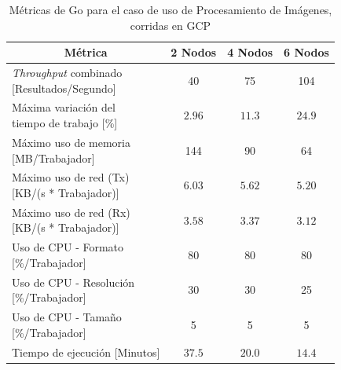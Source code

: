 \documentclass[11pt]{article}
\providecommand{\row}[1]{\parbox{150pt}{\setlength{\baselineskip}{0.2\baselineskip}\strut#1\strut}}
\newcommand{\ipcap}[2]{\caption{Métricas de #1 para el caso de uso de Procesamiento de Imágenes, corridas en #2}}
\newcommand{\english}[1]{\textit{#1}}
\begin{document}
\begin{table}[H]
\centering
\begin{tabular}{|l|c|c|c|}
\hline
\multicolumn{1}{|c|}{Métrica} & 2 Nodos & 4 Nodos & 6 Nodos \\ \hline
\row{\english{Throughput} combinado\\{[Resultados/Segundo]}} & 40 & 75 & 104 \\ \hline
\row{Máxima variación del \\ tiempo de trabajo {[}\%{]}} & $2.96$ & $11.3$ & $24.9$ \\ \hline
\row{Máximo uso de memoria \\ {[MB/Trabajador]}} & 144 & 90 & 64 \\ \hline
\row{Máximo uso de red (Tx) \\ {[KB/(s * Trabajador)]}} & $6.03$ & $5.62$ & $5.20$ \\ \hline
\row{Máximo uso de red (Rx) \\ {[KB/(s * Trabajador)]}} & $3.58$ & $3.37$ & $3.12$ \\ \hline
\row{Uso de CPU - Formato\\{[\%/Trabajador]}} & 80 & 80 & 80 \\ \hline
\row{Uso de CPU - Resolución\\{[\%/Trabajador]}} & 30 & 30 & 25 \\ \hline
\row{Uso de CPU - Tamaño\\{[\%/Trabajador]}} & 5 & 5 & 5 \\ \hline
Tiempo de ejecución [Minutos] & $37.5$ & $20.0$ & $14.4$ \\ \hline
\end{tabular}
\ipcap{Go}{GCP}
\end{table}
\end{document}
